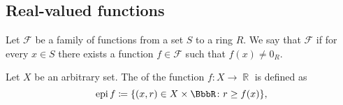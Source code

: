 \subsection{Real-valued functions}\label{subsec:real_valued_functions}

\begin{definition}\label{def:functions_vanish_nowhere}
  Let \( \mathcal{F} \) be a family of functions from a set \( S \) to a ring \( R \). We say that \( \mathcal{F} \)  if for every \( x \in S \) there exists a function \( f \in \mathcal{F} \) such that \( f(x) \neq 0_R \).
\end{definition}

\begin{definition}\label{def:epigraph}
  Let \( X \) be an arbitrary set. The  of the function \( f: X \to \BbbR \) is defined as
  \begin{equation*}
    \epi f \coloneqq \{ (x, r) \in X \times \BbbR \colon r \geq f(x) \},
  \end{equation*}
\end{definition}
